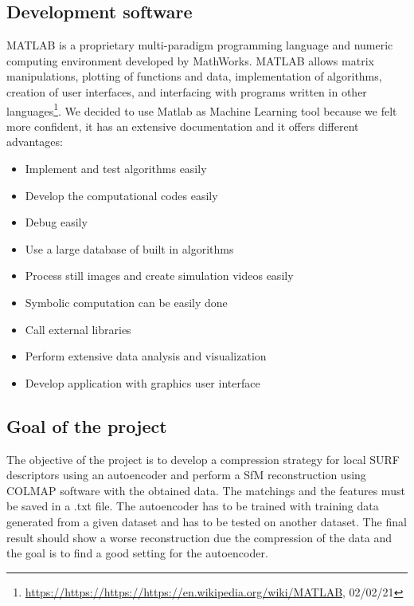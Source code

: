 \subsection{Development software}
MATLAB is a proprietary multi-paradigm programming language and numeric computing environment developed by MathWorks. MATLAB allows matrix manipulations, plotting of functions and data, implementation of algorithms, creation of user interfaces, and interfacing with programs written in other languages\footnote{\url{https://https://https://https://en.wikipedia.org/wiki/MATLAB}, 02/02/21}. We decided to use Matlab as Machine Learning tool because we felt more confident, it has an extensive documentation and it offers different advantages:
\begin{itemize}
\item Implement and test algorithms easily
\item Develop the computational codes easily
\item Debug easily
\item Use a large database of built in algorithms
\item Process still images and create simulation videos easily
\item Symbolic computation can be easily done
\item Call external libraries
\item Perform extensive data analysis and visualization
\item Develop application with graphics user interface
\end{itemize}


\subsection{Goal of the project}
The objective of the project is to develop a compression strategy for local SURF descriptors using an autoencoder and perform a SfM reconstruction using COLMAP software with the obtained data. The matchings and the features must be saved in a .txt file. The autoencoder has to be trained with training data generated from a given dataset and has to be tested on another dataset. The final result should show a worse reconstruction due the compression of the data and the goal is to find a good setting for the autoencoder. 